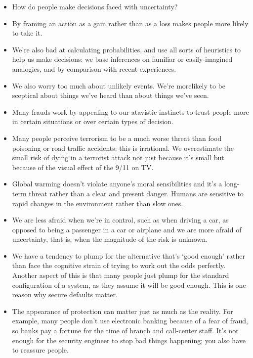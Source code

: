 		\begin{itemize}
			\item How do people make decisions faced with uncertainty?
			\item By framing an action as a gain rather than as a loss makes people more 
			likely to take it. 
			\item We’re also bad at calculating probabilities, and use all sorts of heuristics 
			to help us make decisions: we base inferences on familiar or easily-imagined analogies, 
			and by comparison with recent experiences.
			\item We also worry too much about unlikely events. We’re morelikely to be sceptical 
			about things we’ve heard than about things we’ve seen.
			\item Many frauds work by appealing to our atavistic instincts to trust people 
			more in certain situations or over certain types of decision.
			\item Many people perceive terrorism to be a much worse threat than food poisoning 
			or road traffic accidents: this is irrational.
			We overestimate the small risk of dying in a terrorist attack not just 
			because it’s small but because of the visual effect of the 9/11 on TV.
			\item Global warming doesn’t violate anyone’s moral sensibilities and
			it’s a long-term threat rather than a clear and present danger. Humans are 
			sensitive to rapid changes in the environment rather than slow ones.
			\item We are less afraid when we’re in control, such as when driving a car, as opposed 
			to being a passenger in a car or airplane and we are more afraid of 
			uncertainty, that is, when the magnitude of the risk is unknown.
			\item We have a tendency to plump for the alternative that’s ‘good enough’ rather than 
			face the cognitive strain of trying to work out the odds perfectly. Another
			aspect of this is that many people just plump for the standard configuration
			of a system, as they assume it will be good enough. This is one reason why
			secure defaults matter.
			\item The appearance of protection can matter just as much as the reality. For example,
			many people don't use electronic banking because of a fear of fraud, so banks pay
			a fortune for the time of branch and call-center staff. It's not enough for the security engineer to stop bad things happening; you also have to reassure people.
		\end{itemize} 

